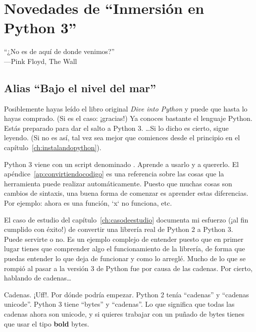 
\chapter{Novedades de ``Inmersión en Python 3''}\label{ch:novedades}

\begin{citaCap}
``¿No es de aquí de donde venimos?''\\
---Pink Floyd, The Wall
\end{citaCap}

\section{Alias ``Bajo el nivel del mar''}

Posiblemente hayas leído el libro original \emph{Dive into Python} y puede que hasta lo hayas comprado. (Si es el caso: ¡gracias!) Ya conoces bastante el lenguaje Python. Estás preparado para dar el salto a Python 3. \ldots Si lo dicho es cierto, sigue leyendo. (Si no es así, tal vez sea mejor que comiences desde el principio en el capítulo~\ref{ch:instalandopython}).

Python 3 viene con un script denominado . Aprende a usarlo y a quererlo. El apéndice~\ref{ap:convirtiendocodigo} es una referencia sobre las cosas que la herramienta  puede realizar automáticamente. Puesto que muchas cosas son cambios de sintaxis, una buena forma de comenzar es aprender estas diferencias. Por ejemplo:  ahora es una función, `x` no funciona, etc.

El caso de estudio del capítulo~\ref{ch:casodeestudio} documenta mi esfuerzo (¡al fin cumplido con éxito!) de convertir una librería real de Python 2 a Python 3. Puede servirte o no. Es un ejemplo complejo de entender puesto que en primer lugar tienes que comprender algo el funcionamiento de la librería, de forma que puedas entender lo que deja de funcionar y como lo arreglé.  Mucho de lo que se rompió al pasar a la versión 3 de Python fue por causa de las cadenas.  Por cierto, hablando de cadenas\ldots

Cadenas. ¡Uff!. Por dónde podría empezar. Python 2 tenía ``cadenas'' y ``cadenas unicode''. Python 3 tiene ``bytes'' y ``cadenas''. Lo que significa que todas las cadenas ahora son unicode, y si quieres trabajar con un puñado de bytes tienes que usar el tipo \textbf{bold} bytes.

